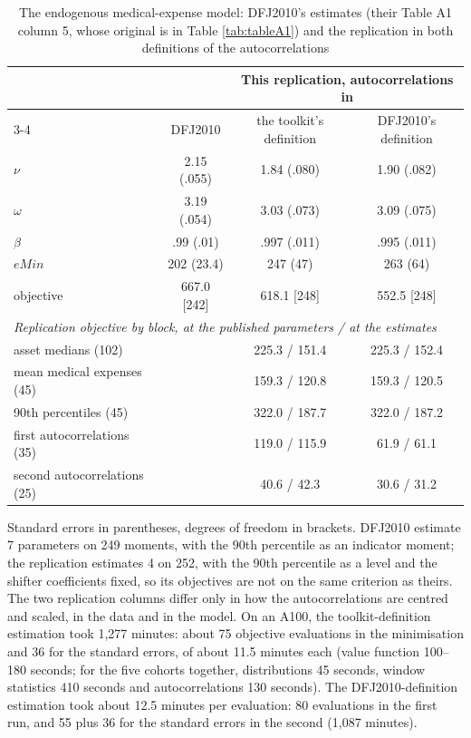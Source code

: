 \documentclass[11pt,fleqn]{article}
\begin{document}
\begin{table}[htbp]
\centering
\caption{The endogenous medical-expense model: DFJ2010's estimates (their Table A1 column 5, whose original is in Table \ref{tab:tableA1}) and the replication in both definitions of the autocorrelations}\label{tab:endog}
\small
\begin{tabular}{lccc}
\toprule
 & & \multicolumn{2}{c}{This replication, autocorrelations in} \\
\cmidrule(lr){3-4}
 & DFJ2010 & the toolkit's definition & DFJ2010's definition \\
\midrule
$\nu$ & 2.15 (.055) & 1.84 (.080) & 1.90 (.082) \\
$\omega$ & 3.19 (.054) & 3.03 (.073) & 3.09 (.075) \\
$\beta$ & .99 (.01) & .997 (.011) & .995 (.011) \\
$eMin$ & 202 (23.4) & 247 (47) & 263 (64) \\
objective & 667.0 [242] & 618.1 [248] & 552.5 [248] \\
\midrule
\multicolumn{4}{l}{\textit{Replication objective by block, at the published parameters / at the estimates}} \\
asset medians (102) & & 225.3 / 151.4 & 225.3 / 152.4 \\
mean medical expenses (45) & & 159.3 / 120.8 & 159.3 / 120.5 \\
90th percentiles (45) & & 322.0 / 187.7 & 322.0 / 187.2 \\
first autocorrelations (35) & & 119.0 / 115.9 & 61.9 / 61.1 \\
second autocorrelations (25) & & 40.6 / 42.3 & 30.6 / 31.2 \\
\bottomrule
\end{tabular}
\par\smallskip
\begin{minipage}{0.95\textwidth}\footnotesize
Standard errors in parentheses, degrees of freedom in brackets. DFJ2010 estimate 7 parameters on 249 moments, with the 90th percentile as an indicator moment; the replication estimates 4 on 252, with the 90th percentile as a level and the shifter coefficients fixed, so its objectives are not on the same criterion as theirs. The two replication columns differ only in how the autocorrelations are centred and scaled, in the data and in the model. On an A100, the toolkit-definition estimation took 1,277 minutes: about 75 objective evaluations in the minimisation and 36 for the standard errors, of about 11.5 minutes each (value function 100--180 seconds; for the five cohorts together, distributions 45 seconds, window statistics 410 seconds and autocorrelations 130 seconds). The DFJ2010-definition estimation took about 12.5 minutes per evaluation: 80 evaluations in the first run, and 55 plus 36 for the standard errors in the second (1,087 minutes).
\end{minipage}
\end{table}
\end{document}
